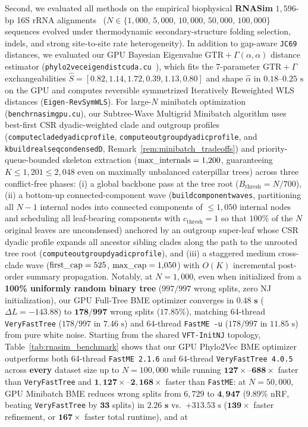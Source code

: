 \documentclass[11pt,a4paper]{article}
\makeatletter
\DeclareRobustCommand{\_}{\ifmmode\nfss@text{\textunderscore}\else\textunderscore\allowbreak\fi}
\theoremstyle{definition}
\makeatother
\begin{document}
Second, we evaluated all methods on the empirical biophysical \textbf{RNASim} $1{,}596$-bp 16S rRNA alignments~\cite{mirarab2015pasta} ($N \in \{1{,}000, \, 5{,}000, \, 10{,}000, \, 50{,}000, \, 100{,}000\}$ sequences evolved under thermodynamic secondary-structure folding selection, indels, and strong site-to-site rate heterogeneity). In addition to gap-aware \texttt{JC69} distances, we evaluated our GPU Bayesian Eigenvalue $\text{GTR}+\Gamma(\alpha,\alpha)$ distance estimator (\texttt{phylo2vec\_eigen\_dist\_cuda.cu}~\cite{penn2025eigen}), which fits the 7-parameter $\text{GTR}+\Gamma$ exchangeabilities $\hat{S} = [0.82, 1.14, 1.72, 0.39, 1.13, 0.80]$ and shape $\hat{\alpha}$ in $0.18\text{--}0.25\text{ s}$ on the GPU and computes reversible symmetrized Iteratively Reweighted WLS distances (\texttt{Eigen-RevSymWLS}). For large-$N$ minibatch optimization (\texttt{bench\_rnasim\_gpu.cu}), our Subtree-Wave Multigrid Minibatch algorithm uses best-first CSR dyadic-weighted clade and outgroup profiles (\texttt{compute\_clade\_dyadic\_profile}, \texttt{compute\_outgroup\_dyadic\_profile}, and \texttt{k\_build\_real\_seq\_condensed\_D}, Remark~\ref{rem:minibatch_tradeoffs}) and priority-queue-bounded skeleton extraction ($\text{max\_internals} = 1{,}200$, guaranteeing $K \le 1{,}201 \le 2{,}048$ even on maximally unbalanced caterpillar trees) across three conflict-free phases: (i) a global backbone pass at the tree root ($B_{\text{thresh}} = N/700$), (ii) a bottom-up connected-component wave (\texttt{build\_component\_waves}, partitioning all $N-1$ internal nodes into connected components of $\le 1{,}050$ internal nodes and scheduling all leaf-bearing components with $c_{\text{thresh}} = 1$ so that $100\%$ of the $N$ original leaves are uncondensed) anchored by an outgroup super-leaf whose CSR dyadic profile expands all ancestor sibling clades along the path to the unrooted tree root (\texttt{compute\_outgroup\_dyadic\_profile}), and (iii) a staggered medium cross-clade wave ($\text{first\_cap} = 525$, $\text{max\_cap} = 1{,}050$) with $O(K)$ incremental post-order summary propagation. Notably, at $N = 1{,}000$, even when initialized from a \textbf{100\% uniformly random binary tree} ($997/997$ wrong splits, zero NJ initialization), our GPU Full-Tree BME optimizer converges in $\mathbf{0.48\text{ s}}$ ($\Delta L = -143.88$) to $\mathbf{178/997}$ wrong splits ($17.85\%$), matching 64-thread \texttt{VeryFastTree} ($178/997$ in $7.46\text{ s}$) and 64-thread \texttt{FastME -u} ($178/997$ in $11.85\text{ s}$) from pure white noise. Starting from the shared \texttt{VFT-InitNJ} topology, Table~\ref{tab:rnasim_benchmark} shows that our GPU Phylo2Vec BME optimizer outperforms both 64-thread \texttt{FastME 2.1.6} and 64-thread \texttt{VeryFastTree 4.0.5} across \textbf{every} dataset size up to $N = 100{,}000$ while running $\mathbf{127\times\text{--}688\times}$ faster than \texttt{VeryFastTree} and $\mathbf{1{,}127\times\text{--}2{,}168\times}$ faster than \texttt{FastME}: at $N = 50{,}000$, GPU Minibatch BME reduces wrong splits from $6{,}729$ to $\mathbf{4{,}947}$ ($\mathbf{9.89\%}$ nRF, beating \texttt{VeryFastTree} by $\mathbf{33}$ splits) in $\mathbf{2.26\text{ s}}$ vs.\ $+313.53\text{ s}$ ($\mathbf{139\times}$ faster refinement, or $\mathbf{167\times}$ faster total runtime), and at 
\end{document}
